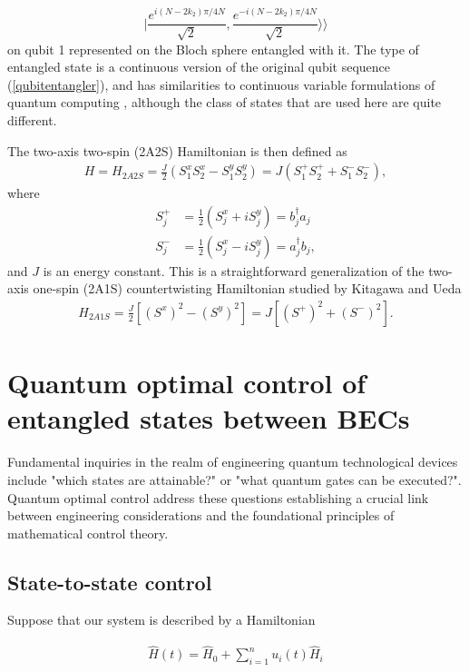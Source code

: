 \documentclass[
aps,%
12pt,%
final,%
notitlepage,%
oneside,%
onecolumn,%
nobibnotes,%
nofootinbib,%
superscriptaddress,%
noshowpacs,%
centertags]%
{revtex4}
\begin{document}
\begin{equation} 
    | \frac{e^{i(N-2 k_2) \pi/4N}}{\sqrt{2}}  , \frac{e^{-i(N-2 k_2) \pi/4N}}{\sqrt{2}} \rangle \rangle  
\end{equation} 
%
on qubit 1 represented on the Bloch sphere entangled with it. The type of entangled state is a continuous version of the original qubit sequence (\ref{qubitentangler}), and has similarities to continuous variable formulations of quantum computing \cite{braunstein2005quantum}, although the class of states that are used here are quite different.

The two-axis two-spin (2A2S) Hamiltonian is then defined as
%
\begin{align}
H = H_{2A2S} = \frac{J}{2} (S_1^x S_2^x - S_1^y S_2^y) = J(S_1^+ S_2^+ + S_1^-S_2^-) ,  
\label{eq:Hamiltonian}
\end{align}
%
where 
%
\begin{align}
S_j^{+} & = \frac{1}{2} (S_j^x + i S_j^y) = b_j^\dagger a_j \nonumber \\
S_j^{-} & =  \frac{1}{2}  (S_j^x - i S_j^y)= a_j^\dagger b_j ,
\end{align}
%
and $ J $ is an energy constant. This is a straightforward generalization of the two-axis one-spin (2A1S) countertwisting Hamiltonian studied by Kitagawa and Ueda \cite{kitagawa1993squeezed}
%
\begin{align}
H_{2A1S} = \frac{J}{2} [ (S^x)^2  - (S^y)^2 ] = J[ (S^+)^2 + (S^-)^2 ] .  
\end{align}
%

\section{Quantum optimal control of entangled states between BECs}

Fundamental inquiries in the realm of engineering quantum technological devices include "which states are attainable?" or "what quantum gates can be executed?". Quantum optimal control address these questions establishing a crucial link between engineering considerations and the foundational principles of mathematical control theory. 

\subsection{State-to-state control}

Suppose that our system is described by a Hamiltonian

\begin{align}
\hat{H}(t) = \hat{H}_0 + \sum_{i=1}^{n} u_i(t) \hat{H}_i
\end{align}
\end{document}
